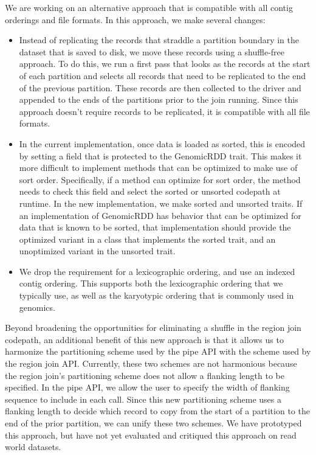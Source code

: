 \documentclass[phd]{ucbthesis}
\begin{document}
We are working on an alternative approach that is compatible with all contig
orderings and file formats. In this approach, we make several changes:

\begin{itemize}
\item Instead of replicating the records that straddle a partition boundary in
  the dataset that is saved to disk, we move these records using a shuffle-free
  approach. To do this, we run a first pass that looks as the records at the
  start of each partition and selects all records that need to be replicated to
  the end of the previous partition. These records are then collected to the
  driver and appended to the ends of the partitions prior to the join running.
  Since this approach doesn't require records to be replicated, it is compatible
  with all file formats.
\item In the current implementation, once data is loaded as sorted, this is
  encoded by setting a field that is protected to the {GenomicRDD} trait.
  This makes it more difficult to implement methods that can be optimized to
  make use of sort order. Specifically, if a method can optimize for sort order,
  the method needs to check this field and select the sorted or unsorted
  codepath at runtime. In the new implementation, we make sorted and unsorted
  traits. If an implementation of {GenomicRDD} has behavior that can
  be optimized for data that is known to be sorted, that implementation should
  provide the optimized variant in a class that implements the sorted trait, and
  an unoptimized variant in the unsorted trait.
\item We drop the requirement for a lexicographic ordering, and use an indexed
  contig ordering. This supports both the lexicographic ordering that we
  typically use, as well as the karyotypic ordering that is commonly used in
  genomics.
\end{itemize}

Beyond broadening the opportunities for eliminating a shuffle in the region join
codepath, an additional benefit of this new approach is that it allows us to
harmonize the partitioning scheme used by the {pipe} API with the scheme
used by the region join API. Currently, these two schemes are not harmonious
because the region join's partitioning scheme does not allow a flanking length
to be specified. In the {pipe} API, we allow the user to specify the
width of flanking sequence to include in each call. Since this new partitioning
scheme uses a flanking length to decide which record to copy from the start of
a partition to the end of the prior partition, we can unify these two schemes.
We have prototyped this approach, but have not yet evaluated and critiqued this
approach on read world datasets.
\end{document}
